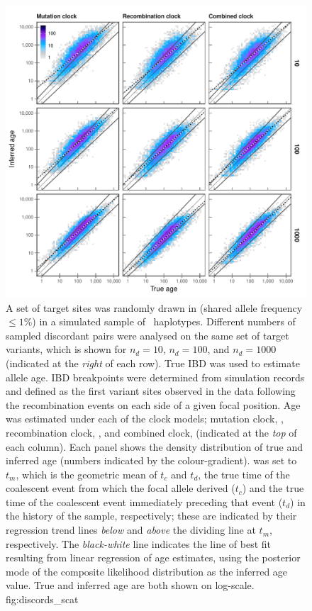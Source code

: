 

\begin{figure}[p]
\includegraphics[width=\textwidth]{./img/ch5/discords_scat}
{A set of  target sites was randomly drawn in \fk{[2,20]} (shared allele frequency ${\leq 1\%}$) in a simulated sample of ~haplotypes.
Different numbers of sampled discordant pairs were analysed on the same set of target variants, which is shown for ${n_d = \num{10}}$, ${n_d = \num{100}}$, and ${n_d = \num{1000}}$ (indicated at the \emph{right} of each row).
True IBD was used to estimate allele age.
IBD breakpoints were determined from simulation records and defined as the first variant sites observed in the data following the  recombination events on each side of a given focal position.
Age was estimated under each of the  clock models; \ie mutation clock, \ClockM, recombination clock, \ClockR, and combined clock, \ClockC (indicated at the \emph{top} of each column).
Each panel shows the density distribution of true and inferred age (numbers indicated by the colour-gradient).
 was set to $t_m$, which is the geometric mean of $t_c$ and $t_d$, \ie the true time of the coalescent event from which the focal allele derived ($t_c$) and the true time of the coalescent event immediately preceding that event ($t_d$) in the history of the sample, respectively; these are indicated by their regression trend lines \emph{below} and \emph{above} the dividing line at $t_m$, respectively.
The \emph{black-white} line indicates the line of best fit resulting from linear regression of age estimates, using the posterior mode of the composite likelihood distribution as the inferred age value.
True and inferred age are both shown on log-scale.}
{fig:discords_scat}
\end{figure}
